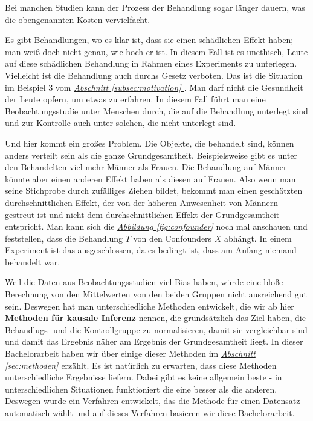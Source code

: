 \documentclass[12pt,a4paper,twoside]{scrartcl}
\numberwithin{equation}{section}
\newcommand{\reffig}[1]{\emph{\hyperref[#1]{Abbildung \ref*{#1}}}}
\newcommand{\refsec}[1]{\emph{\hyperref[#1]{Abschnitt \ref*{#1} }}}
\begin{document}
\noindent   
Bei manchen Studien kann der Prozess der Behandlung sogar länger dauern, was die obengenannten Kosten vervielfacht.\par    

\noindent   
Es gibt Behandlungen, wo es klar ist, dass sie einen schädlichen Effekt haben; man weiß doch nicht genau, wie hoch er ist. In diesem Fall ist es unethisch, Leute auf diese schädlichen Behandlung in Rahmen eines Experiments zu unterlegen. Vielleicht ist die Behandlung auch durchs Gesetz verboten. Das ist die Situation im Beispiel 3 vom \refsec{subsec:motivation}. Man darf nicht die Gesundheit der Leute opfern, um etwas zu erfahren. In diesem Fall führt man eine Beobachtungsstudie unter Menschen durch, die auf die Behandlung unterlegt sind und zur Kontrolle auch unter solchen, die nicht unterlegt sind.\par

\noindent
Und hier kommt ein großes Problem. Die Objekte, die behandelt sind, können anders verteilt sein als die ganze Grundgesamtheit. Beispielsweise gibt es unter den Behandelten viel mehr Männer als Frauen. Die Behandlung auf Männer könnte aber einen anderen Effekt haben als diesen auf Frauen. Also wenn man seine Stichprobe durch zufälliges Ziehen bildet, bekommt man einen geschätzten durchschnittlichen Effekt, der von der höheren Anwesenheit von Männern gestreut ist und nicht dem durchschnittlichen Effekt der Grundgesamtheit entspricht. Man kann sich die \reffig{fig:confounder} noch mal anschauen und feststellen, dass die Behandlung $T$ von den Confounders $X$ abhängt. In einem Experiment ist das ausgeschlossen, da es bedingt ist, dass am Anfang niemand behandelt war.\par


\noindent
Weil die Daten aus Beobachtungsstudien viel Bias haben, würde eine bloße Berechnung von den Mittelwerten von den beiden Gruppen nicht ausreichend gut sein. Deswegen hat man unterschiedliche Methoden entwickelt, die wir ab hier \textbf{Methoden für kausale Inferenz} nennen, die grundsätzlich das Ziel haben, die Behandlugs- und die Kontrollgruppe zu normalisieren, damit sie vergleichbar sind und damit das Ergebnis näher am Ergebnis der Grundgesamtheit liegt. In dieser Bachelorarbeit haben wir über einige dieser Methoden im \refsec{sec:methoden} erzählt. Es ist natürlich zu erwarten, dass diese Methoden unterschiedliche Ergebnisse liefern. Dabei gibt es keine allgemein beste - in unterschiedlichen Situationen funktioniert die eine besser als die anderen. Deswegen wurde ein Verfahren entwickelt, das die Methode für einen Datensatz automatisch wählt und auf dieses Verfahren basieren wir diese Bachelorarbeit\cite{schuler2017synth}.\par   
\end{document}
